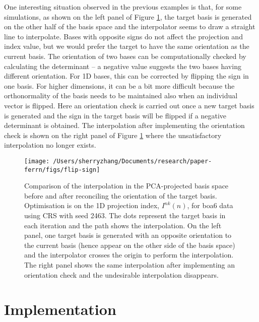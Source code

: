 One interesting situation observed in the previous examples is that, for
some simulations, as shown on the left panel of Figure
\ref{fig:flip-sign}, the target basis is generated on the other half of
the basis space and the interpolator seems to draw a straight line to
interpolate. Bases with opposite signs do not affect the projection and
index value, but we would prefer the target to have the same orientation
as the current basis. The orientation of two bases can be
computationally checked by calculating the determinant -- a negative
value suggests the two bases having different orientation. For 1D bases,
this can be corrected by flipping the sign in one basis. For higher
dimensions, it can be a bit more difficult because the orthonormality of
the basis needs to be maintained also when an individual vector is
flipped. Here an orientation check is carried out once a new target
basis is generated and the sign in the target basis will be flipped if a
negative determinant is obtained. The interpolation after implementing
the orientation check is shown on the right panel of Figure
\ref{fig:flip-sign} where the unsatisfactory interpolation no longer
exists.

\begin{Schunk}
\begin{figure}

{\centering \texttt{[image: /Users/sherryzhang/Documents/research/paper-ferrn/figs/flip-sign]} 

}

\caption[Comparison of the interpolation in the PCA-projected basis space before and after reconciling the orientation of the target basis]{Comparison of the interpolation in the PCA-projected basis space before and after reconciling the orientation of the target basis. Optimisation is on the 1D projection index, $I^{nk}(n)$, for boa6 data using CRS with seed 2463. The dots represent the target basis in each iteration and the path shows the interpolation. On the left panel, one target basis is generated with an opposite orientation to the current basis (hence appear on the other side of the basis space) and the interpolator crosses the origin to perform the interpolation. The right panel shows the same interpolation after implementing an orientation check and the undesirable interpolation disappears.}\label{fig:flip-sign}
\end{figure}
\end{Schunk}

\hypertarget{implementation}{%
\section{Implementation}\label{implementation}}


